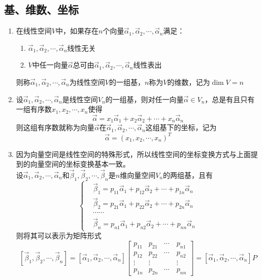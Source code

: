 \documentclass[12pt,a4paper,UTF8]{book}
\begin{document}
\subsection{基、维数、坐标}
\begin{enumerate}
\item 在线性空间$V$中，如果存在$n$个向量$\vec{\alpha}_1,\vec{\alpha}_2,\cdots,\vec{\alpha}_n$满足：
\begin{enumerate}
\item $\vec{\alpha}_1,\vec{\alpha}_2,\cdots,\vec{\alpha}_n$线性无关
\item $V$中任一向量$\vec{\alpha}$总可由$\vec{\alpha}_1,\vec{\alpha}_2,\cdots,\vec{\alpha}_n$线性表出
\end{enumerate}
则称$\vec{\alpha}_1,\vec{\alpha}_2,\cdots,\vec{\alpha}_n$为线性空间$V$的一组基，$n$称为$V$的维数，记为$\operatorname{dim}V=n$
\item 设$\vec{\alpha}_1,\vec{\alpha}_2,\cdots,\vec{\alpha}_n$是线性空间$V_n$的一组基，则对任一向量$\vec{\alpha}\in V_n$，总是有且只有一组有序数$x_1,x_2,\cdots,x_n$使得
\[\vec{\alpha}=x_1\vec{\alpha}_1+x_2\vec{\alpha}_2+\cdots+x_n\vec{\alpha}_n\]
则这组有序数就称为向量$\vec{\alpha}$在$\vec{\alpha}_1,\vec{\alpha}_2,\cdots,\vec{\alpha}_n$这组基下的坐标，记为
\[\vec{\alpha}=\left(x_1,x_2,\cdots,x_n\right)^T\]
\item 因为向量空间是线性空间的特殊形式，所以线性空间的坐标变换方式与上面提到的向量空间的坐标变换基本一致。\\
设$\vec{\alpha}_1,\vec{\alpha}_2,\cdots,\vec{\alpha}_n$和$\vec{\beta}_1,\vec{\beta}_2,\cdots,\vec{\beta}_n$是$n$维向量空间$V_n$的两组基，且有
\[\left\{\begin{aligned}
&\vec{\beta}_1=p_{11}\vec{\alpha}_1+p_{12}\vec{\alpha}_2+\cdots+p_{1n}\vec{\alpha}_n\\
&\vec{\beta}_2=p_{21}\vec{\alpha}_1+p_{22}\vec{\alpha}_2+\cdots+p_{2n}\vec{\alpha}_n\\
&\cdots\cdots\\
&\vec{\beta}_n=p_{n1}\vec{\alpha}_1+p_{n2}\vec{\alpha}_2+\cdots+p_{nn}\vec{\alpha}_n
\end{aligned}\right.\]
则将其可以表示为矩阵形式
\[\left[\vec{\beta}_1,\vec{\beta}_2,\cdots,\vec{\beta}_n\right]=\left[\vec{\alpha}_1,\vec{\alpha}_2,\cdots,\vec{\alpha}_n\right]\begin{bmatrix}p_{11}&p_{21}&\cdots&p_{n1}\\p_{12}&p_{22}&\cdots&p_{n2}\\\vdots&\vdots&\quad&\vdots\\p_{1n}&p_{2n}&\cdots&p_{nn}\end{bmatrix}=\left[\vec{\alpha}_1,\vec{\alpha}_2,\cdots,\vec{\alpha}_n\right]P\]

\end{enumerate}
\end{document}
